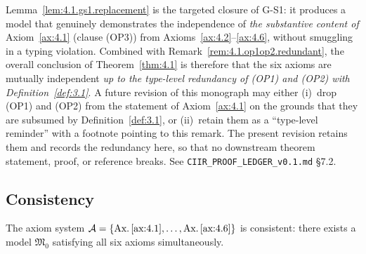 \begin{remark}
\label{rem:4.1.gs1.scope}
Lemma~\ref{lem:4.1.gs1.replacement} is the targeted closure of
G-S1: it produces a model that genuinely demonstrates the
independence of \emph{the substantive content of}
Axiom~\ref{ax:4.1} (clause (OP3)) from
Axioms~\ref{ax:4.2}--\ref{ax:4.6}, without smuggling in a typing
violation.  Combined with
Remark~\ref{rem:4.1.op1op2.redundant}, the overall conclusion of
Theorem~\ref{thm:4.1} is therefore that the six axioms are
mutually independent \emph{up to the type-level redundancy of
\textup{(OP1)} and \textup{(OP2)} with Definition~\ref{def:3.1}}.
A future revision of this monograph may either (i)~drop
\textup{(OP1)} and \textup{(OP2)} from the statement of
Axiom~\ref{ax:4.1} on the grounds that they are subsumed by
Definition~\ref{def:3.1}, or (ii)~retain them as a
``type-level reminder'' with a footnote pointing to this remark.
The present revision retains them and records the redundancy here,
so that no downstream theorem statement, proof, or reference
breaks.  See
\texttt{CIIR\_PROOF\_LEDGER\_v0.1.md} \S7.2.
\end{remark}

\subsection{Consistency}
\label{sec:ch4:consistency}

\begin{theorem}
\label{thm:4.2}
The axiom system
$\mathcal{A} = \{\textup{Ax.}\,\ref{ax:4.1},\ldots,
\textup{Ax.}\,\ref{ax:4.6}\}$
is consistent: there exists a model $\mathfrak{M}_0$ satisfying all
six axioms simultaneously.
\end{theorem}

